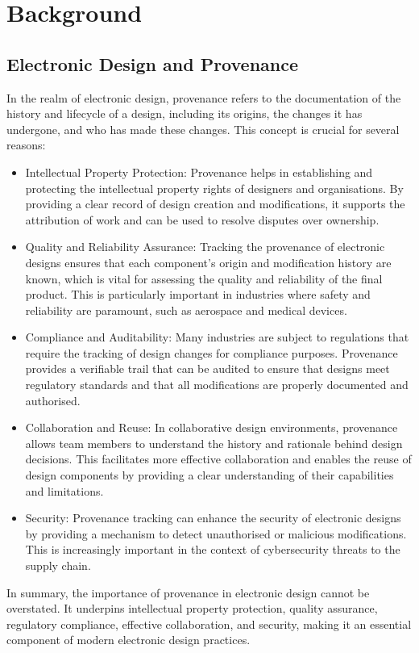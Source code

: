 \documentclass{tufte-handout}
\begin{document}
\section{Background}
\subsection{Electronic Design and Provenance}
In the realm of electronic design, provenance refers to the documentation of the history and lifecycle of a design, including its origins, the changes it has
undergone, and who has made these changes. This concept is crucial for several reasons:
\begin{itemize}
\item Intellectual Property Protection: Provenance helps in establishing and protecting the intellectual property rights of designers and organisations. By
providing a clear record of design creation and modifications, it supports the attribution of work and can be used to resolve disputes over ownership.
\item Quality and Reliability Assurance: Tracking the provenance of electronic designs ensures that each component's origin and modification history are known,
which is vital for assessing the quality and reliability of the final product. This is particularly important in industries where safety and reliability are
paramount, such as aerospace and medical devices.
\item Compliance and Auditability: Many industries are subject to regulations that require the tracking of design changes for compliance purposes. Provenance
provides a verifiable trail that can be audited to ensure that designs meet regulatory standards and that all modifications are properly documented and authorised.
\item Collaboration and Reuse: In collaborative design environments, provenance allows team members to understand the history and rationale behind design decisions.
This facilitates more effective collaboration and enables the reuse of design components by providing a clear understanding of their capabilities and limitations.
\item Security: Provenance tracking can enhance the security of electronic designs by providing a mechanism to detect unauthorised or malicious modifications.
This is increasingly important in the context of cybersecurity threats to the supply chain.
\end{itemize}
In summary, the importance of provenance in electronic design cannot be overstated. It underpins intellectual property protection, quality assurance, regulatory compliance, effective collaboration, and security, making it an essential component of modern electronic design practices.
\end{document}
